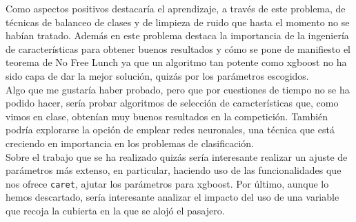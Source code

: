 \documentclass[10pt,a4paper]{article}
\newcommand{\code}[1]{\textcolor{rblue}{\texttt{#1}}} %
\begin{document}
Como aspectos positivos destacaría el aprendizaje, a través de este problema, de técnicas de balanceo de clases y de limpieza de ruido que hasta el momento no se habían tratado. Además en este problema destaca la importancia de la ingeniería de características para obtener buenos resultados y cómo se pone de manifiesto el teorema de No Free Lunch ya que un algoritmo tan potente como xgboost no ha sido capa de dar la mejor solución, quizás por los parámetros escogidos.\\

Algo que me gustaría haber probado, pero que por cuestiones de tiempo no se ha podido hacer, sería probar algoritmos de selección de características que, como vimos en clase, obtenían muy buenos resultados en la competición. También podría explorarse la opción de emplear redes neuronales, una técnica que está creciendo en importancia en los problemas de clasificación.\\

Sobre el trabajo que se ha realizado quizás sería interesante realizar un ajuste de parámetros más extenso, en particular, haciendo uso de las funcionalidades que nos ofrece \code{caret}, ajutar los parámetros para xgboost. Por último, aunque lo hemos descartado, sería interesante analizar el impacto del uso de una variable que recoja la cubierta en la que se alojó el pasajero. 
\end{document}
